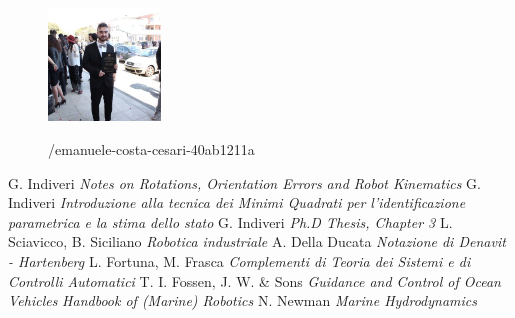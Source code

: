 \documentclass[11 pt,a4paper,twoside,openany]{book}
\begin{document}
\begin{figure}[h]
\includegraphics[width=3cm]{figures/emanuele.jpg}
\vspace{0.3cm}

%
\hspace{0.05cm} /emanuele-costa-cesari-40ab1211a

\end{figure}


\begin{thebibliography}{100}
 G. Indiveri \emph{Notes on Rotations, Orientation Errors and Robot Kinematics}
 G. Indiveri \emph{Introduzione alla tecnica dei Minimi Quadrati per l'identificazione parametrica e la stima dello stato}
 G. Indiveri \emph{Ph.D Thesis, Chapter 3}
 L. Sciavicco, B. Siciliano \emph{Robotica industriale}
 A. Della Ducata \emph{Notazione di Denavit - Hartenberg}
 L. Fortuna, M. Frasca \emph{Complementi di Teoria dei Sistemi e di Controlli Automatici}
 T. I. Fossen, J. W. \& Sons \emph{Guidance and Control of Ocean Vehicles}
 \emph{Handbook of (Marine) Robotics}
 N. Newman \emph{Marine Hydrodynamics}
\end{thebibliography}
\end{document}
